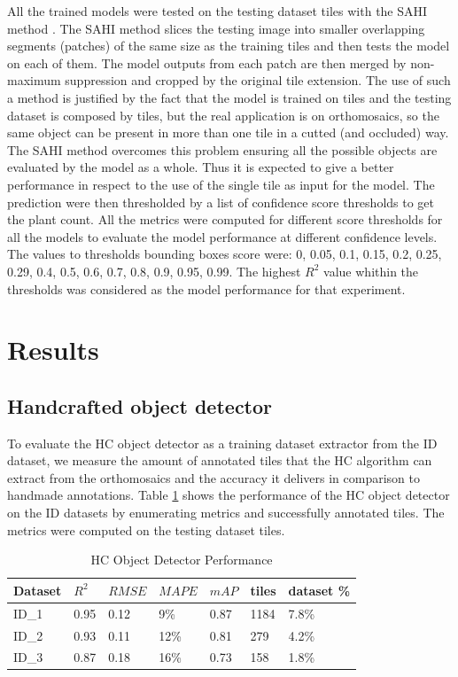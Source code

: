 \documentclass[12pt,a4paper,oneside]{report}
\begin{document}
All the trained models were tested on the testing dataset tiles with the SAHI method \cite{akyonSlicingAidedHyper2022}.
The SAHI method slices the testing image into smaller overlapping segments (patches) 
of the same size as the training tiles and then tests the model on each of them. 
The model outputs from each patch are then merged by non-maximum suppression and 
cropped by the original tile extension.
The use of such a method is justified by the fact that the model is trained on tiles and
the testing dataset is composed by tiles, but the real application is on orthomosaics, so
the same object can be present in more than one tile in a cutted (and occluded) way.
The SAHI method overcomes this problem ensuring all the possible objects are evaluated by the
model as a whole. Thus it is expected to give a better performance in respect to the use of the
single tile as input for the model.
The prediction were then thresholded by a list of confidence score thresholds to get the plant count.
All the metrics were computed for different score thresholds for all the models
to evaluate the model performance at different confidence levels.
The values to thresholds bounding boxes score were: 0, 0.05, 0.1, 0.15, 0.2, 0.25, 0.29, 0.4, 0.5, 0.6, 0.7, 0.8, 0.9, 0.95, 0.99.
The highest $R^2$ value whithin the thresholds was considered as the model 
performance for that experiment.
\section{Results}

\subsection{Handcrafted object detector}

To evaluate the HC object detector as a training dataset extractor from the ID dataset,
we measure the amount of annotated tiles that the HC algorithm can extract from the orthomosaics
and the accuracy it delivers in comparison to handmade annotations.
Table \ref{tab:HC_results} shows the performance of the HC object detector on the ID datasets 
by enumerating metrics and successfully annotated tiles. The metrics were computed
on the testing dataset tiles.

\begin{table}[H]
  \caption{HC Object Detector Performance}
  \label{tab:HC_results}
  \centering
  \begin{tabularx}{\textwidth}{lXXXXXX}
  \toprule
  \textbf{Dataset} & \textbf{$R^2$} & \textbf{$RMSE$} & \textbf{$MAPE$} & \textbf{$mAP$} & \textbf{tiles} & \textbf{dataset \%} \\
  \midrule
  ID\_1 & 0.95 & 0.12 & 9\% & 0.87 & 1184 & 7.8\% \\
  ID\_2 & 0.93 & 0.11 & 12\% & 0.81 & 279 &  4.2\% \\
  ID\_3 & 0.87 & 0.18 & 16\% & 0.73 & 158 & 1.8\% \\
  \bottomrule
  \end{tabularx}
  \end{table}
\end{document}
